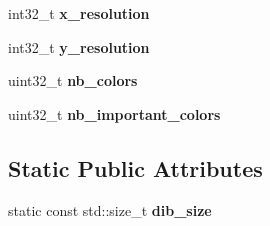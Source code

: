 \begin{DoxyCompactItemize}
\item 
\hypertarget{struct_assimp_1_1_bitmap_1_1_d_i_b_af6ea407698b3210b9cb20c2f9346d4e9}{int32\+\_\+t {\bfseries x\+\_\+resolution}}\label{struct_assimp_1_1_bitmap_1_1_d_i_b_af6ea407698b3210b9cb20c2f9346d4e9}

\item 
\hypertarget{struct_assimp_1_1_bitmap_1_1_d_i_b_a762d6e3c0911dd1aef2a6d0ceea0421f}{int32\+\_\+t {\bfseries y\+\_\+resolution}}\label{struct_assimp_1_1_bitmap_1_1_d_i_b_a762d6e3c0911dd1aef2a6d0ceea0421f}

\item 
\hypertarget{struct_assimp_1_1_bitmap_1_1_d_i_b_af440f5fced97b6be82466ecbf0402b0e}{uint32\+\_\+t {\bfseries nb\+\_\+colors}}\label{struct_assimp_1_1_bitmap_1_1_d_i_b_af440f5fced97b6be82466ecbf0402b0e}

\item 
\hypertarget{struct_assimp_1_1_bitmap_1_1_d_i_b_af1293883ac6b8e3d384e32a2a15fb5e5}{uint32\+\_\+t {\bfseries nb\+\_\+important\+\_\+colors}}\label{struct_assimp_1_1_bitmap_1_1_d_i_b_af1293883ac6b8e3d384e32a2a15fb5e5}

\end{DoxyCompactItemize}
\subsection*{Static Public Attributes}
\begin{DoxyCompactItemize}
\item 
static const std\+::size\+\_\+t {\bfseries dib\+\_\+size}
\end{DoxyCompactItemize}


